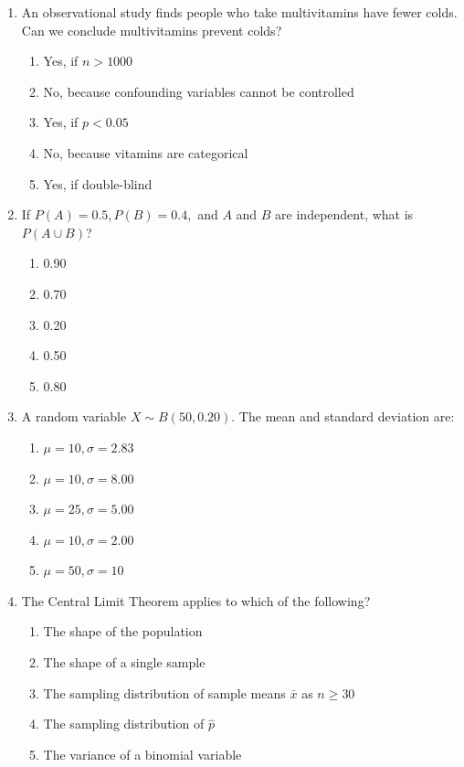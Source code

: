 \begin{enumerate}[leftmargin=1.5em]
  \item An observational study finds people who take multivitamins have fewer colds. Can we conclude multivitamins prevent colds?
  \begin{enumerate}[label=(\Alph*)]
    \item Yes, if $n > 1000$ \item No, because confounding variables cannot be controlled \item Yes, if $p < 0.05$ \item No, because vitamins are categorical \item Yes, if double-blind
  \end{enumerate}

  \item If $P(A) = 0.5, P(B) = 0.4,$ and $A$ and $B$ are independent, what is $P(A \cup B)$?
  \begin{enumerate}[label=(\Alph*)]
    \item 0.90 \item 0.70 \item 0.20 \item 0.50 \item 0.80
  \end{enumerate}

  \item A random variable $X \sim B(50, 0.20)$. The mean and standard deviation are:
  \begin{enumerate}[label=(\Alph*)]
    \item $\mu = 10, \sigma = 2.83$ \item $\mu = 10, \sigma = 8.00$ \item $\mu = 25, \sigma = 5.00$ \item $\mu = 10, \sigma = 2.00$ \item $\mu = 50, \sigma = 10$
  \end{enumerate}

  \item The Central Limit Theorem applies to which of the following?
  \begin{enumerate}[label=(\Alph*)]
    \item The shape of the population \item The shape of a single sample \item The sampling distribution of sample means $\bar{x}$ as $n \ge 30$ \item The sampling distribution of $\hat{p}$ \item The variance of a binomial variable
  \end{enumerate}


\end{enumerate}
